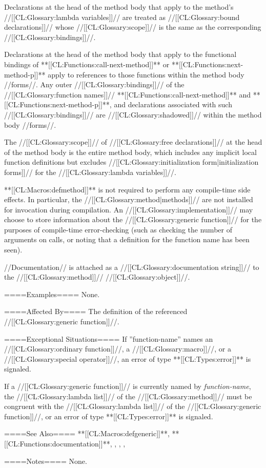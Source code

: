 Declarations at the head of the method body that apply to the method's //[[CL:Glossary:lambda variables]]// are treated as //[[CL:Glossary:bound declarations]]// whose //[[CL:Glossary:scope]]// is the same as the corresponding //[[CL:Glossary:bindings]]//.

Declarations at the head of the method body that apply to the functional bindings of **[[CL:Functions:call-next-method]]** or **[[CL:Functions:next-method-p]]** apply to references to those functions within the method body //forms//. Any outer //[[CL:Glossary:bindings]]// of the //[[CL:Glossary:function names]]// **[[CL:Functions:call-next-method]]** and **[[CL:Functions:next-method-p]]**, and declarations associated with such //[[CL:Glossary:bindings]]// are //[[CL:Glossary:shadowed]]// within the method body //forms//.

The //[[CL:Glossary:scope]]// of //[[CL:Glossary:free declarations]]// at the head of the method body is the entire method body, which includes any implicit local function definitions but excludes //[[CL:Glossary:initialization form|initialization forms]]// for the //[[CL:Glossary:lambda variables]]//.

**[[CL:Macros:defmethod]]** is not required to perform any compile-time side effects. In particular, the //[[CL:Glossary:method|methods]]// are not installed for invocation during compilation. An //[[CL:Glossary:implementation]]// may choose to store information about the //[[CL:Glossary:generic function]]// for the purposes of compile-time error-checking (such as checking the number of arguments on calls, or noting that a definition for the function name has been seen).

//Documentation// is attached as a //[[CL:Glossary:documentation string]]// to the //[[CL:Glossary:method]]// //[[CL:Glossary:object]]//.

====Examples====
None.

====Affected By====
The definition of the referenced //[[CL:Glossary:generic function]]//.

====Exceptional Situations====
If ''function-name'' names an //[[CL:Glossary:ordinary function]]//, a //[[CL:Glossary:macro]]//, or a //[[CL:Glossary:special operator]]//, an error of type **[[CL:Types:error]]** is signaled.

If a //[[CL:Glossary:generic function]]// is currently named by {\it function-name}, the //[[CL:Glossary:lambda list]]// of the //[[CL:Glossary:method]]// must be congruent with the //[[CL:Glossary:lambda list]]// of the //[[CL:Glossary:generic function]]//, or an error of type **[[CL:Types:error]]** is signaled.

====See Also====
**[[CL:Macros:defgeneric]]**, **[[CL:Functions:documentation]]**, {\secref\IntroToMethods}, {\secref\GFMethodLambdaListCongruency}, {\secref\SpecializerQualifierAgreement}, {\secref\DocVsDecls}

====Notes====
None.

   
